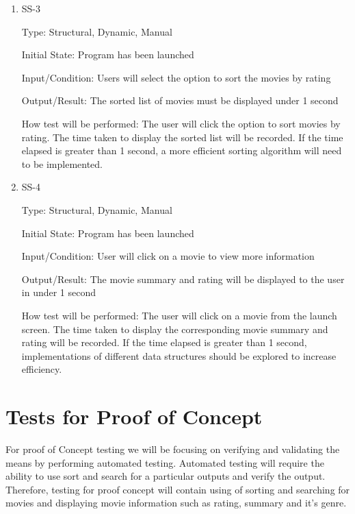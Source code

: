 \documentclass[12pt, titlepage]{article}
\begin{document}
\begin{enumerate}
	
	\item{SS-3\\}
	
	Type: Structural, Dynamic, Manual
	
	Initial State: Program has been launched
	
	Input/Condition: Users will select the option to sort the movies by rating
	
	Output/Result: The sorted list of movies must be displayed under 1 second
	
	How test will be performed: The user will click the option to sort movies by rating. The time taken to display the sorted list will be recorded. If the time elapsed is greater than 1 second, a more efficient sorting algorithm will need to be implemented.
	
	\item{SS-4\\}
	
	Type: Structural, Dynamic, Manual
	
	Initial State: Program has been launched 
	
	Input/Condition: User will click on a movie to view more information 
	
	Output/Result: The movie summary and rating will be displayed to the user in under 1 second
	
	How test will be performed: The user will click on a movie from the launch screen. The time taken to display the corresponding movie summary and rating will be recorded. If the time elapsed is greater than 1 second, implementations of different data structures should be explored to increase efficiency.
	
\end{enumerate}

\section{Tests for Proof of Concept}

For proof of Concept testing we will be focusing on verifying and validating the means by performing automated testing. Automated testing will require the ability to use sort and search for a particular outputs and verify the output. Therefore, testing for proof concept will contain using of sorting and searching for movies and displaying movie information such as rating, summary and it’s genre. 
\end{document}
